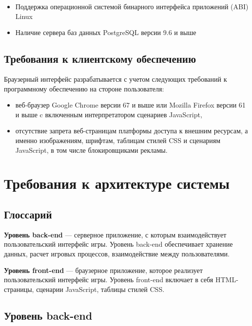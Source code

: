 \documentclass[12pt, a4paper]{article}
\begin{document}
\begin{itemize}
\item Поддержка операционной системой бинарного интерфейса приложений (ABI) Linux
\item Наличие сервера баз данных PostgreSQL версии 9.6 и выше
\end{itemize}

\subsection{Требования к клиентскому обеспечению}

Браузерный интерфейс разрабатывается с учетом следующих требований к
программному обеспечению на стороне пользователя:

\begin{itemize}
\item веб-браузер Google Chrome версии 67 и выше или
Mozilla Firefox версии 61 и выше c включенным интерпретатором сценариев JavaScript,
\item отсутствие запрета веб-страницам платформы доступа к внешним ресурсам,
а именно изображениям, шрифтам, таблицам стилей CSS и сценариям JavaScript,
в том числе блокировщиками рекламы.
\end{itemize}

\section{Требования к архитектуре системы}

\subsection{Глоссарий}

\textbf{Уровень back-end} — серверное приложение, с которым взаимодействует
пользовательский интерфейс игры. Уровень back-end обеспечивает хранение данных,
расчет игровых процессов, взаимодействие между пользователями.

\textbf{Уровень front-end} — браузерное приложение, которое реализует
пользовательский интерфейс игры. Уровень front-end включает в себя
HTML-страницы, сценарии JavaScript, таблицы стилей CSS.

\subsection{Уровень back-end}
\end{document}
